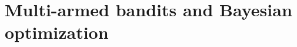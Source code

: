 \documentclass[dissertation,math,vertlayout,pdfa,colorlinks]{aaltoseries}
\DeclareMathOperator{\KLt}{KL}
\begin{document}
 

\section{Multi-armed bandits and Bayesian optimization}\label{MAP_and_BO}
\end{document}
